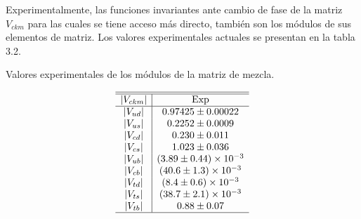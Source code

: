 Experimentalmente, las funciones invariantes ante cambio de fase de la matriz
$V_{ckm}$ para las cuales se tiene acceso m\'as directo, tambi\'en son los 
m\'odulos de sus elementos de matriz. Los valores experimentales actuales 
\cite{Nak201001} se presentan en la tabla 3.2.%
{\tiny
\begin{table}[h!]\label{pdg}
\begin{scriptsize}
\caption{Valores experimentales de los m\'odulos de la matriz de mezcla.} 
$$\ba{c|c} \hline \hline
|V_{ckm}|&\mbox{Exp}\\ \hline
|V_{ud}|&0.97425\pm0.00022\\
|V_{us}|&0.2252\pm0.0009  \\
|V_{cd}|&0.230\pm0.011    \\
|V_{cs}|&1.023\pm0.036    \\
|V_{ub}|&(3.89\pm0.44)\times10^{-3} \\
|V_{cb}|&(40.6\pm1.3)\times10^{-3}  \\
|V_{td}|&(8.4\pm0.6)\times10^{-3}   \\
|V_{ts}|&(38.7\pm2.1)\times10^{-3}  \\
|V_{tb}|&0.88\pm0.07     \\ \hline
\ea
$$
\end{scriptsize}
\end{table}
}
